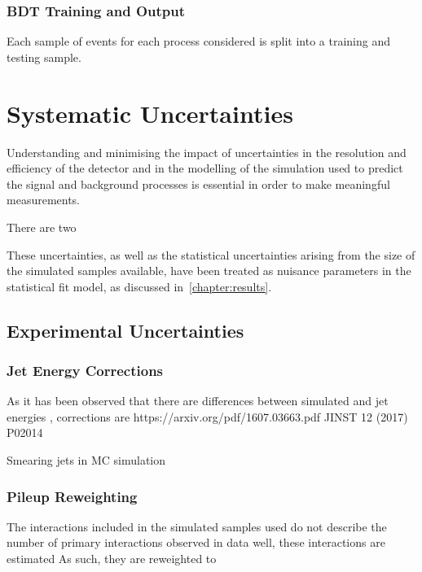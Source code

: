 
\subsection{BDT Training and Output}
Each sample of events for each process considered is split into a training and testing sample.
\chapter{Systematic Uncertainties}\label{chapter:systematics}
Understanding and minimising the impact of uncertainties in the resolution and efficiency of the detector and in the modelling of the simulation used to predict the signal and background processes is essential in order to make meaningful measurements.

There are two 

These uncertainties, as well as the statistical uncertainties arising from the size of the simulated samples available, have been treated as nuisance parameters in the statistical fit model, as discussed in~\ref{chapter:results}.

\section{Experimental Uncertainties}
\subsection{Jet Energy Corrections}
As it has been observed that there are differences between simulated and jet energies , 
corrections are
https://arxiv.org/pdf/1607.03663.pdf
JINST 12 (2017) P02014

Smearing jets in MC simulation 

\subsection{Pileup Reweighting}
The \PU interactions included in the simulated samples used do not describe the number of primary interactions observed in data well, these interactions are estimated 
As such, they are reweighted to 

